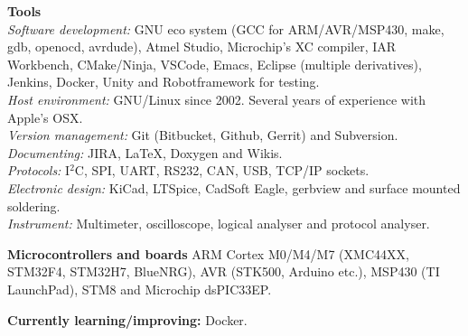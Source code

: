 \documentclass[a4paper,margin,line]{res} \usepackage{latexsym}
\begin{document}
\begin{resume}
{\bf Tools}\\ {\em Software development:} GNU eco system (GCC for
ARM/AVR/MSP430, make, gdb, openocd, avrdude), Atmel Studio,
Microchip's XC compiler, IAR Workbench, CMake/Ninja, VSCode, Emacs, Eclipse
(multiple derivatives), Jenkins, Docker, Unity and Robotframework for testing.
\\ {\em Host environment:} GNU/Linux since 2002. Several years of
experience with Apple's OSX.\\ {\em Version management:} Git
(Bitbucket, Github, Gerrit) and Subversion. \\ {\em Documenting:}
JIRA, \LaTeX, Doxygen and Wikis. \\ {\em Protocols:} I$^2$C, SPI,
UART, RS232, CAN, USB, TCP/IP sockets.\\ {\em Electronic design:}
KiCad, LTSpice, CadSoft Eagle, gerbview and surface mounted
soldering. \\ {\em Instrument:} Multimeter, oscilloscope, logical
analyser and protocol analyser.


{\bf Microcontrollers and boards} ARM Cortex M0/M4/M7 (XMC44XX, STM32F4,
STM32H7, Blue\-NRG), AVR (STK500, Arduino etc.), MSP430 (TI
LaunchPad), STM8 and Microchip dsPIC33EP.

{\bf Currently learning/improving:} Docker.






\end{resume}
\end{document}
